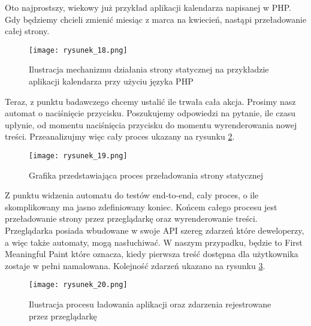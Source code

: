 Oto najprostszy, wiekowy już przykład aplikacji kalendarza napisanej w PHP. Gdy będziemy chcieli zmienić miesiąc z marca na kwiecień, nastąpi przeładowanie całej strony.

\begin{figure}[htbp]
    \centering
    \texttt{[image: rysunek\_18.png]}
    \caption{Ilustracja mechanizmu działania strony statycznej na przykładzie aplikacji kalendarza przy użyciu języka PHP}
    \label{fig:rysunek_18}
\end{figure}

Teraz, z punktu badawczego chcemy ustalić ile trwała cała akcja. Prosimy nasz automat o naciśnięcie przycisku.
Poszukujemy odpowiedzi na pytanie, ile czasu upłynie, od momentu naciśnięcia przycisku do momentu wyrenderowania nowej treści. Przeanalizujmy więc cały proces ukazany na rysunku \ref{fig:rysunek_19}.

\begin{figure}[htbp]
    \centering
    \texttt{[image: rysunek\_19.png]}
    \caption{Grafika przedstawiająca proces przeładowania strony statycznej}
    \label{fig:rysunek_19}
\end{figure}

Z punktu widzenia automatu do testów end-to-end, cały proces, o ile skomplikowany ma jasno zdefiniowany koniec.
Końcem całego procesu jest przeładowanie strony przez przeglądarkę oraz wyrenderowanie treści.
Przeglądarka posiada wbudowane w swoje API szereg zdarzeń które deweloperzy, a więc także automaty, mogą nasłuchiwać.
W naszym przypadku, będzie to First Meaningful Paint \cite{rail-model} które oznacza, kiedy pierwsza treść dostępna dla użytkownika zostaje w pełni namalowana.
Kolejność zdarzeń ukazano na rysunku \ref{fig:rysunek_20}.

\begin{figure}[htbp]
    \centering
    \texttt{[image: rysunek\_20.png]}
    \caption{Ilustracja procesu ładowania aplikacji oraz zdarzenia rejestrowane przez przeglądarkę}
    \label{fig:rysunek_20}
\end{figure}

